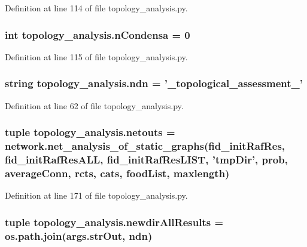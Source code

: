 Definition at line 114 of file topology\-\_\-analysis.\-py.

\hypertarget{a00128_a38aa665f11207bbd8cd2da4c382d4aca}{
\subsubsection[{n\-Condensa}]{\setlength{\rightskip}{0pt plus 5cm}int topology\-\_\-analysis.\-n\-Condensa = 0}}\label{a00128_a38aa665f11207bbd8cd2da4c382d4aca}


Definition at line 115 of file topology\-\_\-analysis.\-py.

\hypertarget{a00128_aa6d4ad4089dc05372dcdfe03c969b8b4}{
\subsubsection[{ndn}]{\setlength{\rightskip}{0pt plus 5cm}string topology\-\_\-analysis.\-ndn = '\-\_\-topological\-\_\-assessment\-\_\-'}}\label{a00128_aa6d4ad4089dc05372dcdfe03c969b8b4}


Definition at line 62 of file topology\-\_\-analysis.\-py.

\hypertarget{a00128_af42f57da8ba80463f419efaf0f6f2c33}{
\subsubsection[{netouts}]{\setlength{\rightskip}{0pt plus 5cm}tuple topology\-\_\-analysis.\-netouts = network.\-net\-\_\-analysis\-\_\-of\-\_\-static\-\_\-graphs({\bf fid\-\_\-init\-Raf\-Res}, {\bf fid\-\_\-init\-Raf\-Res\-A\-L\-L}, {\bf fid\-\_\-init\-Raf\-Res\-L\-I\-S\-T}, 'tmp\-Dir', {\bf prob}, {\bf average\-Conn}, rcts, cats, {\bf food\-List}, maxlength)}}\label{a00128_af42f57da8ba80463f419efaf0f6f2c33}


Definition at line 171 of file topology\-\_\-analysis.\-py.

\hypertarget{a00128_a8e1c34cb190151a28fd81e19d6252253}{
\subsubsection[{newdir\-All\-Results}]{\setlength{\rightskip}{0pt plus 5cm}tuple topology\-\_\-analysis.\-newdir\-All\-Results = os.\-path.\-join(args.\-str\-Out, {\bf ndn})}}\label{a00128_a8e1c34cb190151a28fd81e19d6252253}


